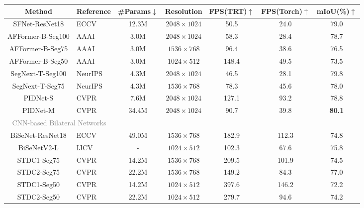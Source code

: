 \documentclass[letterpaper]{article} %
\begin{document}
\begin{table}[t]
    \centering
  \begin{tabular}{c l|c|c|c|c|c}%
    \Xhline{1pt}
    Method & Reference &\#Params$\downarrow$ &Resolution &FPS(TRT)$\uparrow$ &FPS(Torch)$\uparrow$ &mIoU(\%)$\uparrow$ \\
    \hline
    SFNet-ResNet18  &ECCV~\citeyear{li2020semantic} &12.3M  &$2048 \times 1024$ &50.5 &24.0 &79.0  \\
    AFFormer-B-Seg100 &AAAI~\citeyear{dong2023afformer} &3.0M &$2048 \times 1024$ &58.3 &28.4 &78.7 \\
    AFFormer-B-Seg75  &AAAI~\citeyear{dong2023afformer} &3.0M &$1536 \times 768$ &96.4 &38.6 &76.5 \\
    AFFormer-B-Seg50  &AAAI~\citeyear{dong2023afformer} &3.0M &$1024 \times 512$ &148.4 &49.5 &73.5 \\
    SegNext-T-Seg100 &NeurIPS~\citeyear{guo2022segnext} &4.3M &$2048 \times 1024$ &46.5 &28.1 &79.8 \\
    SegNext-T-Seg75  &NeurIPS~\citeyear{guo2022segnext} &4.3M &$1536 \times 768$ &78.3 &45.6 &78.0 \\
    PIDNet-S  &CVPR~\citeyear{xu2023pidnet}  &7.6M &$2048 \times 1024$ &127.1 &93.2 &78.8 \\
    PIDNet-M  &CVPR~\citeyear{xu2023pidnet}  &34.4M &$2048 \times 1024$ &90.7 &39.8 &\textbf{80.1} \\
    \hline
    \multicolumn{2}{c|}{\textcolor{gray}{CNN-based Bilateral Networks}} & &  & & &\\
    BiSeNet-ResNet18  &ECCV~\citeyear{yu2018bisenet}  &49.0M  &$1536 \times 768$     &182.9 &112.3 &74.8  \\
    BiSeNetV2-L      &IJCV~\citeyear{yu2021bisenet}   &-      &$1024 \times 512$    &102.3 &67.6    &75.8   \\
    STDC1-Seg75 &CVPR~\citeyear{fan2021rethinking} &14.2M &$1536 \times 768$ &209.5 &101.9 &74.5 \\
    STDC2-Seg75 &CVPR~\citeyear{fan2021rethinking} &22.2M &$1536 \times 768$ &149.2 &84.3  &77.0 \\
    STDC1-Seg50 &CVPR~\citeyear{fan2021rethinking} &14.2M &$1024 \times 512$ &397.6 &146.2 &72.2 \\
    STDC2-Seg50 &CVPR~\citeyear{fan2021rethinking} &22.2M &$1024 \times 512$ &279.7 &94.6  &74.2 \\

\end{tabular}
\end{table}
\end{document}
